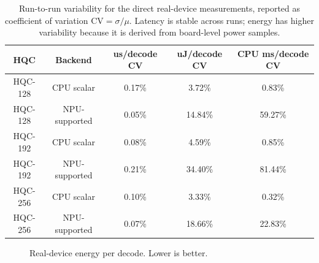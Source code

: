 \begin{table}[htbp]
\centering
\renewcommand{\arraystretch}{1.15}
\small
\begin{tabular}{|c|c|c|c|c|}
\hline
\textbf{HQC} & \textbf{Backend} & \textbf{us/decode CV} &
\textbf{uJ/decode CV} & \textbf{CPU ms/decode CV} \\
\hline
HQC-128 & CPU scalar    & 0.17\% & 3.72\% & 0.83\% \\
\hline
HQC-128 & NPU-supported & 0.05\% & 14.84\% & 59.27\% \\
\hline
HQC-192 & CPU scalar    & 0.08\% & 4.59\% & 0.85\% \\
\hline
HQC-192 & NPU-supported & 0.21\% & 34.40\% & 81.44\% \\
\hline
HQC-256 & CPU scalar    & 0.10\% & 3.33\% & 0.32\% \\
\hline
HQC-256 & NPU-supported & 0.07\% & 18.66\% & 22.83\% \\
\hline
\end{tabular}
\vspace{0.5em}
\caption{Run-to-run variability for the direct real-device measurements, reported as coefficient of variation \(\mathrm{CV}=\sigma/\mu\). Latency is stable across runs; energy has higher variability because it is derived from board-level power samples.}
\label{tab:real-device-stability}
\end{table}

\begin{figure}[H]
\centering
{}
\caption{Real-device energy per decode. Lower is better.}
\label{fig:real-device-energy}
\end{figure}

